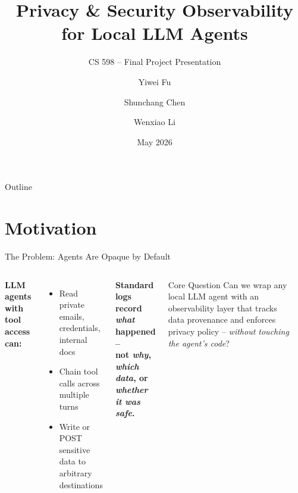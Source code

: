 \documentclass[aspectratio=169]{beamer}
\title[Privacy \& Security Observability for LLM Agents]{%
  Privacy \& Security Observability\\for Local LLM Agents}
\subtitle{CS 598 -- Final Project Presentation}
\author{Yiwei Fu \and Shunchang Chen \and Wenxiao Li}
\date{May 2026}
\begin{document}
\begin{frame}
  \titlepage
\end{frame}

\begin{frame}{Outline}
  \tableofcontents
\end{frame}

\section{Motivation}

\begin{frame}{The Problem: Agents Are Opaque by Default}
  \begin{columns}[T]
    \textbf{LLM agents with tool access can:}
    \begin{itemize}
      \item Read private emails, credentials, internal docs
      \item Chain tool calls across multiple turns
      \item Write or POST sensitive data to arbitrary destinations
    \end{itemize}
    \vspace{0.5em}
    \textbf{Standard logs record \emph{what} happened --\\
    not \emph{why}, \emph{which data}, or \emph{whether it was safe}.}
    \vspace{0.5em}
    \begin{block}{Core Question}
      Can we wrap any local LLM agent with an observability layer
      that tracks data provenance and enforces privacy policy --
      \emph{without touching the agent's code}?
    \end{block}

    \begin{center}
    \end{center}
  \end{columns}
\end{frame}
\end{document}
